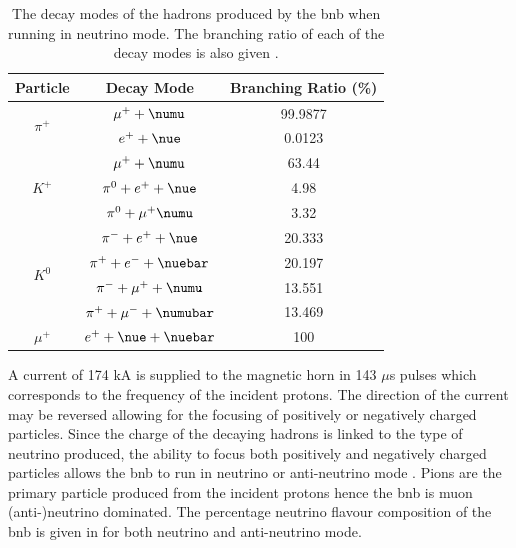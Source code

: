 \begin{table}[h]
\begin{tabular}{ccc}
Particle                 & Decay Mode                        & Branching Ratio (\%) \\ \hline
\multirow{2}{*}{$\pi^+$} & $\mu^+ + \numu$               & 99.9877             \\
                         & $e^+ + \nue$                     & 0.0123              \\ \hline
\multirow{3}{*}{$K^+$}   & $\mu^+ + \numu$               & 63.44               \\
                         & $\pi^0 + e^+ + \nue$             & 4.98                \\
                         & $\pi^0 + \mu^+ \numu$         & 3.32                \\ \hline
\multirow{4}{*}{$K^0$}   & $\pi^- + e^+ + \nue$             & 20.333              \\
                         & $\pi^+ + e^- + \nuebar$         & 20.197              \\
                         & $\pi^- + \mu^+ + \numu$       & 13.551              \\
                         & $\pi^+ + \mu^- + \numubar$ & 13.469              \\ \hline
$\mu^+$                   & $e^+ + \nue + \nuebar$       & 100                
\end{tabular}
\caption[Hadron decay mode in the BNB.]{The decay modes of the hadrons produced by the \gls{bnb} when running in neutrino mode. The branching ratio of each of the decay modes is also given \cite{BNB_flux}.}
\label{Table: BNB decay modes}
\end{table}

\newpage
A current of 174 kA is supplied to the magnetic horn in 143 $\mu$s pulses which corresponds to the frequency of the incident protons. The direction of the current may be reversed allowing for the focusing of positively or negatively charged particles. Since the charge of the decaying hadrons is linked to the type of neutrino produced, the ability to focus both positively and negatively charged particles allows the \gls{bnb} to run in neutrino or anti-neutrino mode \cite{BNB_flux}. Pions are the primary particle produced from the incident protons hence the \gls{bnb} is muon (anti-)neutrino dominated. The percentage neutrino flavour composition of the \gls{bnb} is given in  for both neutrino and anti-neutrino mode.


